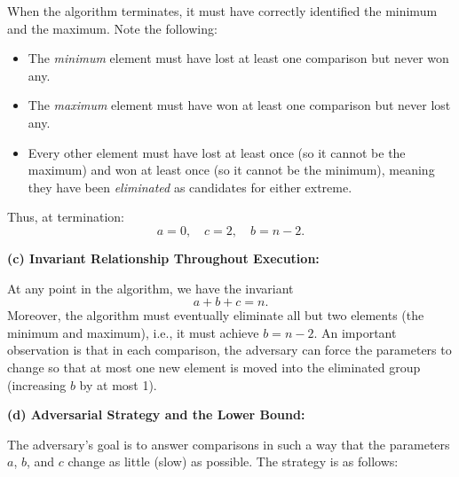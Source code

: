 \documentclass[11pt]{article}
\begin{document}
    When the algorithm terminates, it must have correctly identified the minimum and the maximum. Note the following:
    \begin{itemize}
        \item The \emph{minimum} element must have lost at least one comparison but never won any.
        \item The \emph{maximum} element must have won at least one comparison but never lost any.
        \item Every other element must have lost at least once (so it cannot be the maximum) and won at least once (so it cannot be the minimum), meaning they have been \emph{eliminated} as candidates for either extreme.
    \end{itemize}
    Thus, at termination:
    \[
    a = 0,\quad c = 2,\quad b = n-2.
    \]
    
    \bigskip
    
    \textbf{(c) Invariant Relationship Throughout Execution:}
    
    At any point in the algorithm, we have the invariant
    \[
    a + b + c = n.
    \]
    Moreover, the algorithm must eventually eliminate all but two elements (the minimum and maximum), i.e., it must achieve \( b = n-2 \). An important observation is that in each comparison, the adversary can force the parameters to change so that at most one new element is moved into the eliminated group (increasing \( b \) by at most 1).
    
    \bigskip
    
    \textbf{(d) Adversarial Strategy and the Lower Bound:}
    
    The adversary’s goal is to answer comparisons in such a way that the parameters \( a \), \( b \), and \( c \) change as little (slow) as possible. The strategy is as follows:
    
\end{document}

